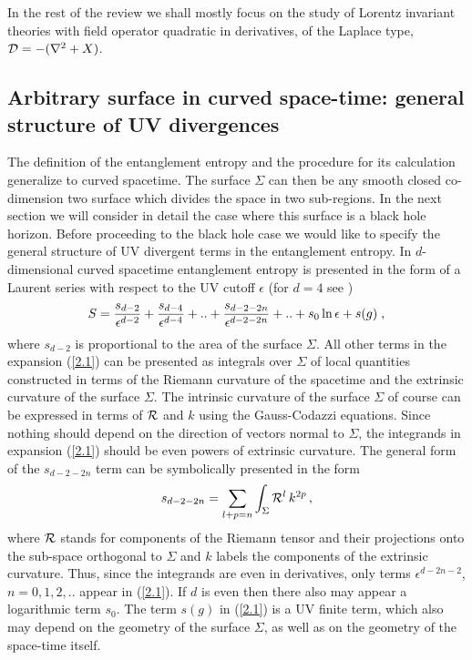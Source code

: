 \documentclass[12pt]{article}
\def\be{\begin{eqnarray}}
\def\ee{\end{eqnarray}}
\def\lb{\label}
\def\o{\over}
\begin{document}
\medskip


In the rest of the review we shall mostly focus on the study of Lorentz invariant theories with  field operator quadratic in derivatives, of the Laplace type, ${\cal D}=-(\nabla^2+X)$.

\subsection{Arbitrary surface in curved space-time: general structure of UV divergences}
The definition of the entanglement entropy and the  procedure for its calculation   generalize  to curved spacetime.
The surface $\Sigma$ can then be any smooth closed co-dimension two surface  which divides the space in two sub-regions. In the next section we will consider in detail the case where this surface is a black hole horizon. 
Before proceeding to the  black hole case  we would like to specify the general structure of UV divergent terms in the entanglement entropy.
In $d$-dimensional curved  spacetime  entanglement entropy is presented in the form of a Laurent series with respect to the
UV cutoff $\epsilon$ (for $d=4$ see  	\cite{Solodukhin:2008dh})
\be
S={s_{d-2}\o \epsilon^{d-2}}+{s_{d-4}\o \epsilon^{d-4}}+.. +{s_{d-2-2n}\o \epsilon^{d-2-2n}}+..+s_0\ln\epsilon+s(g)\; ,
\lb{2.1}
\ee
where $s_{d-2}$ is proportional to the area of the surface $\Sigma$. All other terms in the expansion 
(\ref{2.1}) can be presented as integrals over  $\Sigma$ of local quantities constructed in terms of the Riemann curvature of the spacetime and the extrinsic curvature of the surface $\Sigma$. The intrinsic curvature of the surface $\Sigma$ of course can be expressed in terms of $\cal R$ and $k$ using the Gauss-Codazzi equations.
Since nothing should depend on the direction of  vectors normal to $\Sigma$, the integrands in expansion (\ref{2.1}) should be even powers of extrinsic curvature. The general form of the $s_{d-2-2n}$ term can be symbolically presented in the form
\be
s_{d-2-2n}=\sum_{l+p=n}\int_\Sigma {\cal R}^l\, k^{2p}\, ,
\lb{general-form}
\ee
where $\cal R$ stands for components of the Riemann tensor  and their projections onto the sub-space orthogonal to  $\Sigma$ and $ k$  labels  the components of the extrinsic curvature. 
Thus, since the integrands are even in derivatives, only terms $\epsilon^{d-2n-2}$, $n=0, 1, 2, ..$ appear in (\ref{2.1}). If  $d$ is even then there also may appear a logarithmic term $s_0$.  The term $s(g)$ in (\ref{2.1}) is a UV finite term, which also may depend on the geometry of the surface $\Sigma$, as well as on the geometry of the space-time itself. 
\end{document}
